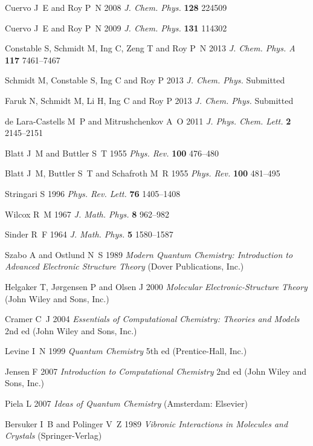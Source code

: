 \documentclass[12pt]{iopart}
\begin{document}
\begin{thebibliography}{100}
Cuervo J~E and Roy P~N 2008 {\em J. Chem. Phys.\/} {\bf 128} 224509

Cuervo J~E and Roy P~N 2009 {\em J. Chem. Phys.\/} {\bf 131} 114302

Constable S, Schmidt M, Ing C, Zeng T and Roy P~N 2013 {\em J. Chem. Phys. A\/}
  {\bf 117} 7461--7467

Schmidt M, Constable S, Ing C and Roy P 2013 {\em J. Chem. Phys.\/} Submitted

Faruk N, Schmidt M, Li H, Ing C and Roy P 2013 {\em J. Chem. Phys.\/} Submitted

{de Lara-Castells} M~P and Mitrushchenkov A~O 2011 {\em J. Phys. Chem. Lett.\/}
  {\bf 2} 2145--2151

Blatt J~M and Buttler S~T 1955 {\em Phys. Rev.\/} {\bf 100} 476--480

Blatt J~M, Buttler S~T and Schafroth M~R 1955 {\em Phys. Rev.\/} {\bf 100}
  481--495

Stringari S 1996 {\em Phys. Rev. Lett.\/} {\bf 76} 1405--1408

Wilcox R~M 1967 {\em J. Math. Phys.\/} {\bf 8} 962--982

Sinder R~F 1964 {\em J. Math. Phys.\/} {\bf 5} 1580--1587

Szabo A and Ostlund N~S 1989 {\em Modern Quantum Chemistry: Introduction to
  Advanced Electronic Structure Theory\/} (Dover Publications, Inc.)

Helgaker T, J{\o}rgensen P and Olsen J 2000 {\em Molecular Electronic-Structure
  Theory\/} (John Wiley and Sons, Inc.)

Cramer C~J 2004 {\em Essentials of Computational Chemistry: Theories and
  Models\/} 2nd ed (John Wiley and Sons, Inc.)

Levine I~N 1999 {\em Quantum Chemistry\/} 5th ed (Prentice-Hall, Inc.)

Jensen F 2007 {\em Introduction to Computational Chemistry\/} 2nd ed (John
  Wiley and Sons, Inc.)

Piela L 2007 {\em Ideas of Quantum Chemistry\/} (Amsterdam: Elsevier)

Bersuker I~B and Polinger V~Z 1989 {\em Vibronic Interactions in Molecules and
  Crystals\/} (Springer-Verlag)


\end{thebibliography}
\end{document}
